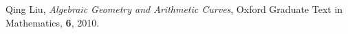 \begin{thebibliography}{99}
    \par
       Qing Liu, 
      \textit{Algebraic Geometry and Arithmetic Curves}, 
      Oxford Graduate Text in Mathematics, 
      \textbf{6}, 2010.
\end{thebibliography}